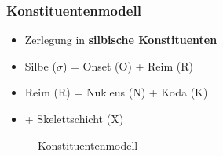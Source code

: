
\begin{frame}
\frametitle{Konstituentenmodell}

\begin{itemize}
	\item Zerlegung in \textbf{silbische Konstituenten}
	\item Silbe ($\sigma$) = Onset (O) + Reim (R)
	\item Reim (R) = Nukleus (N) + Koda (K)
	\item + Skelettschicht (X)
\end{itemize}


\begin{figure}
%
\centering
{}

\caption{Konstituentenmodell}
\end{figure}

\end{frame}




